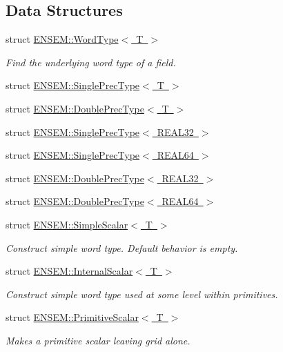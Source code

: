 \subsection*{Data Structures}
\begin{DoxyCompactItemize}
\item 
struct \mbox{\hyperlink{structENSEM_1_1WordType}{E\+N\+S\+E\+M\+::\+Word\+Type$<$ T $>$}}
\begin{DoxyCompactList}\small\item\em Find the underlying word type of a field. \end{DoxyCompactList}\item 
struct \mbox{\hyperlink{structENSEM_1_1SinglePrecType}{E\+N\+S\+E\+M\+::\+Single\+Prec\+Type$<$ T $>$}}
\item 
struct \mbox{\hyperlink{structENSEM_1_1DoublePrecType}{E\+N\+S\+E\+M\+::\+Double\+Prec\+Type$<$ T $>$}}
\item 
struct \mbox{\hyperlink{structENSEM_1_1SinglePrecType_3_01REAL32_01_4}{E\+N\+S\+E\+M\+::\+Single\+Prec\+Type$<$ R\+E\+A\+L32 $>$}}
\item 
struct \mbox{\hyperlink{structENSEM_1_1SinglePrecType_3_01REAL64_01_4}{E\+N\+S\+E\+M\+::\+Single\+Prec\+Type$<$ R\+E\+A\+L64 $>$}}
\item 
struct \mbox{\hyperlink{structENSEM_1_1DoublePrecType_3_01REAL32_01_4}{E\+N\+S\+E\+M\+::\+Double\+Prec\+Type$<$ R\+E\+A\+L32 $>$}}
\item 
struct \mbox{\hyperlink{structENSEM_1_1DoublePrecType_3_01REAL64_01_4}{E\+N\+S\+E\+M\+::\+Double\+Prec\+Type$<$ R\+E\+A\+L64 $>$}}
\item 
struct \mbox{\hyperlink{structENSEM_1_1SimpleScalar}{E\+N\+S\+E\+M\+::\+Simple\+Scalar$<$ T $>$}}
\begin{DoxyCompactList}\small\item\em Construct simple word type. Default behavior is empty. \end{DoxyCompactList}\item 
struct \mbox{\hyperlink{structENSEM_1_1InternalScalar}{E\+N\+S\+E\+M\+::\+Internal\+Scalar$<$ T $>$}}
\begin{DoxyCompactList}\small\item\em Construct simple word type used at some level within primitives. \end{DoxyCompactList}\item 
struct \mbox{\hyperlink{structENSEM_1_1PrimitiveScalar}{E\+N\+S\+E\+M\+::\+Primitive\+Scalar$<$ T $>$}}
\begin{DoxyCompactList}\small\item\em Makes a primitive scalar leaving grid alone. \end{DoxyCompactList}\item 

\end{DoxyCompactItemize}
